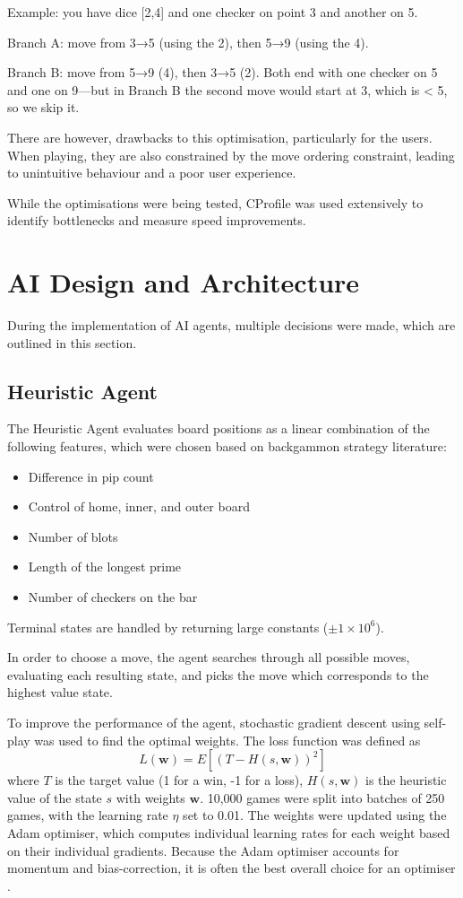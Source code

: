 Example: you have dice [2,4] and one checker on point 3 and another on 5.

Branch A: move from 3→5 (using the 2), then 5→9 (using the 4).

Branch B: move from 5→9 (4), then 3→5 (2).
Both end with one checker on 5 and one on 9—but in Branch B the second move would start at 3, which is < 5, so we skip it.

There are however, drawbacks to this optimisation, particularly for the users. When playing, they are also constrained by the move ordering constraint, leading to unintuitive behaviour and a poor user experience. 

While the optimisations were being tested, CProfile was used extensively to identify bottlenecks and measure speed improvements.


\section{AI Design and Architecture}
During the implementation of AI agents, multiple decisions were made, which are outlined in this section.


\subsection{Heuristic Agent}
\label{sec:heuristic}
The Heuristic Agent evaluates board positions as a linear combination of the following features, which were chosen based on backgammon strategy literature:
\begin{itemize}
    \item Difference in pip count
    \item Control of home, inner, and outer board
    \item Number of blots
    \item Length of the longest prime
    \item Number of checkers on the bar
\end{itemize}
Terminal states are handled by returning large constants ($\pm 1\times 10^6$).

In order to choose a move, the agent searches through all possible moves, evaluating each resulting state, and picks the move which corresponds to the highest value state. 

To improve the performance of the agent, stochastic gradient descent using self-play was used to find the optimal weights. The loss function was defined as 
\begin{equation}
    L(\mathbf{w})=E\left[(T-H(s, \mathbf{w}))^2\right]
\end{equation}
where $T$ is the target value (1 for a win, -1 for a loss), $H(s, \mathbf{w})$ is the heuristic value of the state $s$ with weights $\mathbf{w}$. 10,000 games were split into batches of 250 games, with the learning rate $\eta$ set to 0.01. 
The weights were updated using the Adam optimiser, which computes individual learning rates for each weight based on their individual gradients. 
Because the Adam optimiser accounts for momentum and bias-correction, it is often the best overall choice for an optimiser \cite{adam1}\cite{adam2}. 


